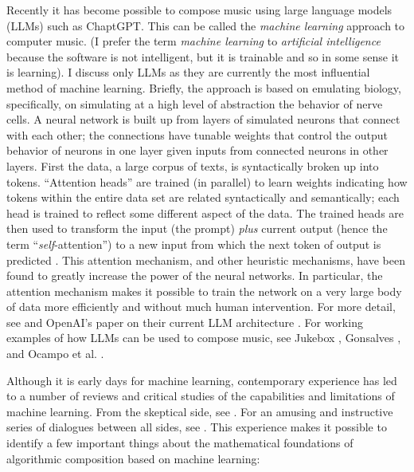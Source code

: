 \documentclass[11pt]{scrartcl}
\begin{document}
Recently it has become possible to compose music using large language models (LLMs) such as ChaptGPT. This can be called the \emph{machine learning} approach to computer music. (I prefer the term \emph{machine learning} to \emph{artificial intelligence} because the software is not intelligent, but it is trainable and so in some sense it is learning). I discuss only LLMs as they are currently the most influential method of machine learning. Briefly, the approach is based on emulating biology, specifically, on simulating at a high level of abstraction the behavior of nerve cells. A neural network is built up from layers of simulated neurons that connect with each other; the connections have tunable weights that control the output behavior of neurons in one layer given inputs from connected neurons in other layers. First the data, a large corpus of texts, is syntactically broken up into tokens. ``Attention heads'' are trained (in parallel) to learn weights indicating how tokens within the entire data set are related syntactically and semantically; each head is trained to reflect some different aspect of the data. The trained heads are then used to transform the input (the prompt) \emph{plus} current output (hence the term ``\emph{self}-attention'') to a new input from which the next token of output is predicted \parencite{vaswani2017attention}. This attention mechanism, and other heuristic mechanisms, have been found to greatly increase the power of the neural networks. In particular, the attention mechanism makes it possible to train the network on a very large body of data more efficiently and without much human intervention. For more detail, see \parencite{zhang2023complete} and OpenAI's paper on their current LLM architecture \parencite{openai2023gpt4}. For working examples of how LLMs can be used to compose music, see Jukebox \parencite{openai2023jukebox}, Gonsalves \parencite{aitunes}, and Ocampo et al. \parencite{ocampo2023using}.

Although it is early days for machine learning, contemporary experience has led to a number of reviews and critical studies of the capabilities and limitations of machine learning. From the skeptical side, see \parencite{dale2021gpt}. For an amusing and instructive series of dialogues between all sides, see \parencite{shtetl}. This experience makes it possible to identify a few important things about the mathematical foundations of algorithmic composition based on machine learning:
\end{document}

